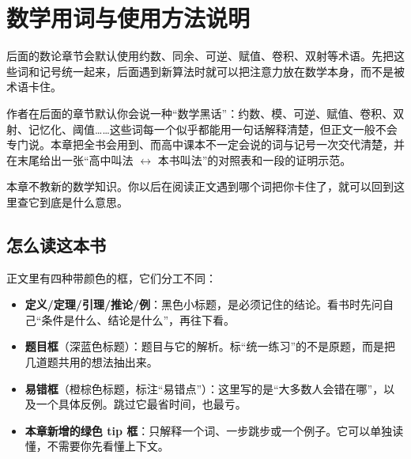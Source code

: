 
\setcounter{chapter}{-1}
\chapter{数学用词与使用方法说明}
\begin{chapterintro}[章节导读]
后面的数论章节会默认使用约数、同余、可逆、赋值、卷积、双射等术语。先把这些词和记号统一起来，后面遇到新算法时就可以把注意力放在数学本身，而不是被术语卡住。
\end{chapterintro}

\begin{tip}[这一章解决什么问题]
作者在后面的章节默认你会说一种“数学黑话”：约数、模、可逆、赋值、卷积、双射、记忆化、阈值……这些词每一个似乎都能用一句话解释清楚，但正文一般不会专门说。本章把全书会用到、而高中课本不一定会说的词与记号一次交代清楚，并在末尾给出一张“高中叫法 $\leftrightarrow$ 本书叫法”的对照表和一段的证明示范。

本章不教新的数学知识。你以后在阅读正文遇到哪个词把你卡住了，就可以回到这里查它到底是什么意思。
\end{tip}

\section{怎么读这本书}


正文里有四种带颜色的框，它们分工不同：

\begin{itemize}
\item \textbf{定义/定理/引理/推论/例}：黑色小标题，是必须记住的结论。看书时先问自己“条件是什么、结论是什么”，再往下看。
\item \textbf{题目框}（深蓝色标题）：题目与它的解析。标“统一练习”的不是原题，而是把几道题共用的想法抽出来。
\item \textbf{易错框}（橙棕色标题，标注“易错点”）：这里写的是“大多数人会错在哪”，以及一个具体反例。跳过它最省时间，也最亏。
\item \textbf{本章新增的绿色 tip 框}：只解释一个词、一步跳步或一个例子。它可以单独读懂，不需要你先看懂上下文。
\end{itemize}


